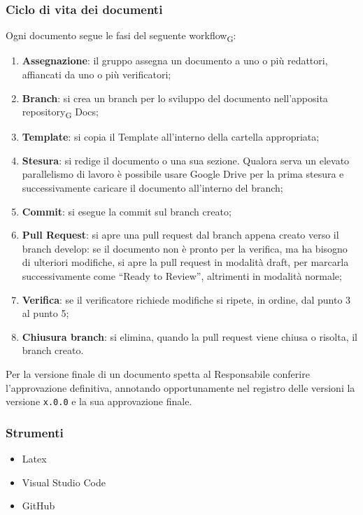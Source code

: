 \subsubsection{Ciclo di vita dei documenti}
Ogni documento segue le fasi del seguente workflow\textsubscript{G}:
\begin{enumerate}
    \item \textbf{Assegnazione}: il gruppo assegna un documento a uno o più redattori, affiancati da uno o più verificatori;
    \item \textbf{Branch}: si crea un branch per lo sviluppo del documento nell’apposita repository\textsubscript{G} Docs;
    \item \textbf{Template}: si copia il Template all'interno della cartella appropriata;
    \item \textbf{Stesura}: si redige il documento o una sua sezione. Qualora serva un elevato parallelismo di lavoro è possibile usare Google Drive per la prima stesura e successivamente caricare il documento all’interno del branch;
    \item \textbf{Commit}: si esegue la commit sul branch creato;
    \item \textbf{Pull Request}: si apre una pull request dal branch appena creato verso il branch develop: se il documento non è pronto per la verifica, ma ha bisogno di ulteriori modifiche, si apre la pull request in modalità draft, per marcarla successivamente come “Ready to Review”, altrimenti in modalità normale;
    \item \textbf{Verifica}: se il verificatore richiede modifiche si ripete, in ordine, dal punto 3 al punto 5;
    \item \textbf{Chiusura branch}: si elimina, quando la pull request viene chiusa o risolta, il branch creato.
\end{enumerate}
Per la versione finale di un documento spetta al Responsabile conferire l’approvazione definitiva, annotando opportunamente nel registro delle versioni la versione \texttt{x.0.0} e la sua approvazione finale.


\subsubsection{Strumenti}
\begin{itemize}
    \item Latex
    \item Visual Studio Code
    \item GitHub
\end{itemize}
